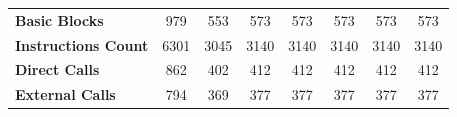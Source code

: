 \documentclass{relatorio}
\begin{document}
\begin{table}[]
\begin{tabular}{lccccccc}
		\multicolumn{1}{l|}{{\color[HTML]{032F62} \textbf{Basic Blocks}}}                                                              & 979                                  & 553                                & 573                                      & 573                                                                                                               & 573                                                                                         & 573                                     & 573                                                                                                   \\
		\multicolumn{1}{l|}{{\color[HTML]{032F62} \textbf{Instructions Count}}}                                                        & 6301                                 & 3045                               & 3140                                     & 3140                                                                                                              & 3140                                                                                        & 3140                                    & 3140                                                                                                  \\
		\multicolumn{1}{l|}{{\color[HTML]{032F62} \textbf{Direct Calls}}}                                                              & 862                                  & 402                                & 412                                      & 412                                                                                                               & 412                                                                                         & 412                                     & 412                                                                                                   \\
		\multicolumn{1}{l|}{{\color[HTML]{032F62} \textbf{External Calls}}}                                                            & 794                                  & 369                                & 377                                      & 377                                                                                                               & 377                                                                                         & 377                                     & 377                                                                                                   \\

\end{tabular}
\end{table}
\end{document}
